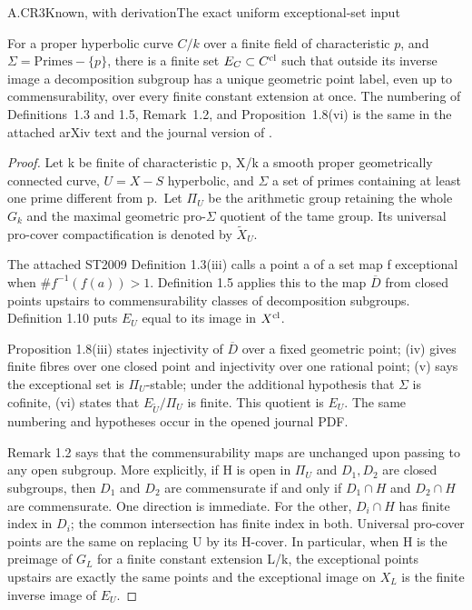 \begin{claim}{A.CR3}{Known, with derivation}{The exact uniform exceptional-set input}

For a proper hyperbolic curve $C/k$ over a finite field of
characteristic $p$, and $\Sigma=\mathrm{Primes}-\{p\}$, there is a
finite set $E_C\subset C^{\mathrm{cl}}$ such that outside its inverse image
a decomposition subgroup has a unique geometric point label, even
up to commensurability, over every finite constant extension at once.
The numbering of Definitions~1.3 and 1.5, Remark~1.2, and
Proposition~1.8(vi) is the same in the attached arXiv text and the
journal version of \cite{ST2009}.

\end{claim}

\begin{proof}

Let k be finite of characteristic p, X/k a smooth proper geometrically connected curve, \(U=X-S\) hyperbolic, and \({\Sigma}\) a set of primes containing at least one prime different from p.~Let \({\Pi}_U\) be the arithmetic group retaining the whole \(G_k\) and the maximal geometric pro-\({\Sigma}\) quotient of the tame group. Its universal pro-cover compactification is denoted by \(\widetilde X_U\).

The attached ST2009 Definition 1.3(iii) calls a point a of a set map f exceptional when \(\#f^{-1}(f(a))>1\). Definition 1.5 applies this to the map \(\overline D\) from closed points upstairs to commensurability classes of decomposition subgroups. Definition 1.10 puts \(E_U\) equal to its image in \(X^{\rm cl}\).

Proposition 1.8(iii) states injectivity of \(\overline D\) over a fixed geometric point; (iv) gives finite fibres over one closed point and injectivity over one rational point; (v) says the exceptional set is \({\Pi}_U\)-stable; under the additional hypothesis that \({\Sigma}\) is cofinite, (vi) states that \(E_{\widetilde U}/\Pi_U\) is finite. This quotient is \(E_U\). The same numbering and hypotheses occur in the opened journal PDF.

Remark 1.2 says that the commensurability maps are unchanged upon passing to any open subgroup. More explicitly, if H is open in \({\Pi}_U\) and \(D_1,D_2\) are closed subgroups, then \(D_1\) and \(D_2\) are commensurate if and only if \(D_1{\cap}H\) and \(D_2{\cap}H\) are commensurate. One direction is immediate. For the other, \(D_i{\cap}H\) has finite index in \(D_i\); the common intersection has finite index in both. Universal pro-cover points are the same on replacing U by its H-cover. In particular, when H is the preimage of \(G_L\) for a finite constant extension L/k, the exceptional points upstairs are exactly the same points and the exceptional image on \(X_L\) is the finite inverse image of \(E_U\).


\end{proof}
